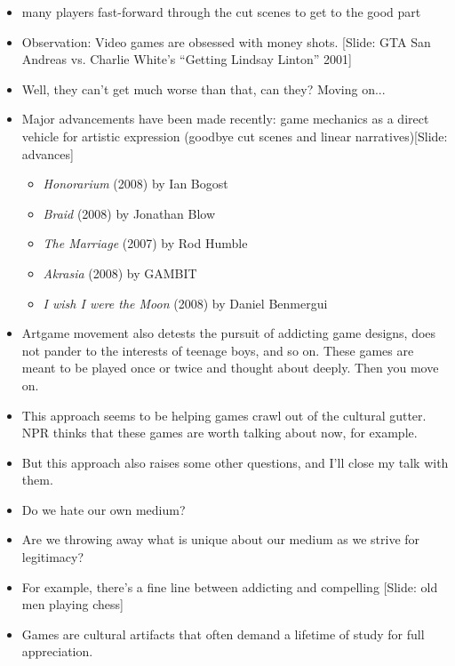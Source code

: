 \documentclass[12pt]{article}
\begin{document}
{\begin{itemize}
\item many players fast-forward through the cut scenes to get to the good part


\item Observation:  Video games are obsessed with money shots. [Slide:  GTA San Andreas vs. Charlie White's ``Getting Lindsay Linton'' 2001]

\item Well, they can't get much worse than that, can they?  Moving on...  


\item Major advancements have been made recently:  game mechanics as a direct vehicle for artistic expression (goodbye cut scenes and linear narratives)[Slide:  advances] {\large \begin{itemize}
\item {\it Honorarium} (2008) by Ian Bogost
\item {\it Braid} (2008) by Jonathan Blow
\item {\it The Marriage} (2007) by Rod Humble
\item {\it Akrasia} (2008) by GAMBIT
\item {\it I wish I were the Moon} (2008) by Daniel Benmergui
\end{itemize} }

\item Artgame movement also detests the pursuit of addicting game designs, does not pander to the interests of teenage boys, and so on.  These games are meant to be played once or twice and thought about deeply.  Then you move on.

\item This approach seems to be helping games crawl out of the cultural gutter.  NPR thinks that these games are worth talking about now, for example.

\item But this approach also raises some other questions, and I'll close my talk with them.

\item Do we hate our own medium?

\item Are we throwing away what is unique about our medium as we strive for legitimacy?

\item For example, there's a fine line between addicting and compelling [Slide: old men playing chess]

\item Games are cultural artifacts that often demand a lifetime of study for full appreciation.


\end{itemize}}
\end{document}
